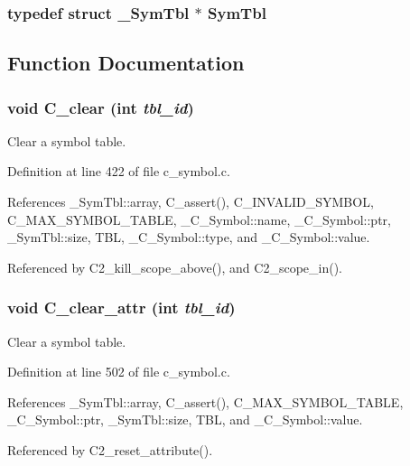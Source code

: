 \subsubsection{\setlength{\rightskip}{0pt plus 5cm}typedef struct \bf{\_\-Sym\-Tbl} $\ast$ \bf{Sym\-Tbl}}\label{c__symbol_8h_e56ca042859b9c5a7ae8e6e54ac02cb1}




\subsection{Function Documentation}
\subsubsection{\setlength{\rightskip}{0pt plus 5cm}void C\_\-clear (int {\em tbl\_\-id})}\label{c__symbol_8h_2c6a25544c7672e28467bbcd9b55a579}


Clear a symbol table. 

Definition at line 422 of file c\_\-symbol.c.

References \_\-Sym\-Tbl::array, C\_\-assert(), C\_\-INVALID\_\-SYMBOL, C\_\-MAX\_\-SYMBOL\_\-TABLE, \_\-C\_\-Symbol::name, \_\-C\_\-Symbol::ptr, \_\-Sym\-Tbl::size, TBL, \_\-C\_\-Symbol::type, and \_\-C\_\-Symbol::value.

Referenced by C2\_\-kill\_\-scope\_\-above(), and C2\_\-scope\_\-in().
\subsubsection{\setlength{\rightskip}{0pt plus 5cm}void C\_\-clear\_\-attr (int {\em tbl\_\-id})}\label{c__symbol_8h_ec887c3f5afd02e24ba755048268e0e0}


Clear a symbol table. 

Definition at line 502 of file c\_\-symbol.c.

References \_\-Sym\-Tbl::array, C\_\-assert(), C\_\-MAX\_\-SYMBOL\_\-TABLE, \_\-C\_\-Symbol::ptr, \_\-Sym\-Tbl::size, TBL, and \_\-C\_\-Symbol::value.

Referenced by C2\_\-reset\_\-attribute().
